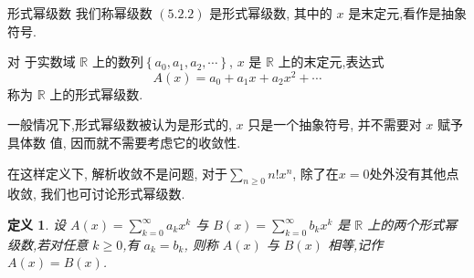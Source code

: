 \documentclass[punct]{ctexbeamer}
\newtheorem{defi}[thm]{定义}
\begin{document}
\begin{frame}{形式幂级数}
我们称幂级数 $(5.2 .2)$ 是形式幂级数, 其中的 $x$ 是末定元,看作是抽象符号.


对 于实数域 $\mathbb{R}$ 上的数列$
\left\{a_{0}, a_{1}, a_{2}, \cdots\right\}
$,
$x$ 是 $\mathbb{R}$ 上的末定元,表达式
$$
A(x)=a_{0}+a_{1} x+a_{2} x^{2}+\cdots
$$
称为 $\mathbb{R}$ 上的形式幂级数.


一般情况下,形式幂级数被认为是形式的,  $x$ 只是一个抽象符号, 并\alert{不需要对 $x$ 赋予具体数 值, 因而就不需要考虑它的收敛性}.


 在这样定义下, 解析收敛不是问题,  对于$\sum_{n \geq 0} n ! x^{n}$, 除了在$x=0$处外没有其他点收敛, 我们也可讨论形式幂级数.





\begin{defi}
	\textsl {设 $A(x)=\sum_{k=0}^{\infty} a_{k} x^{k}$ 与 $B(x)=\sum_{k=0}^{\infty} b_{k} x^{k}$ 是 $\mathbb{R}$ 上的两个形式幂 级数,若对任意 $k \geqslant 0$,有 $a_{k}=b_{k}$, 则称 $A(x)$ 与 $B(x)$ 相等,记作 $A(x)=B(x)$.}
\end{defi}


\end{frame}
\end{document}
